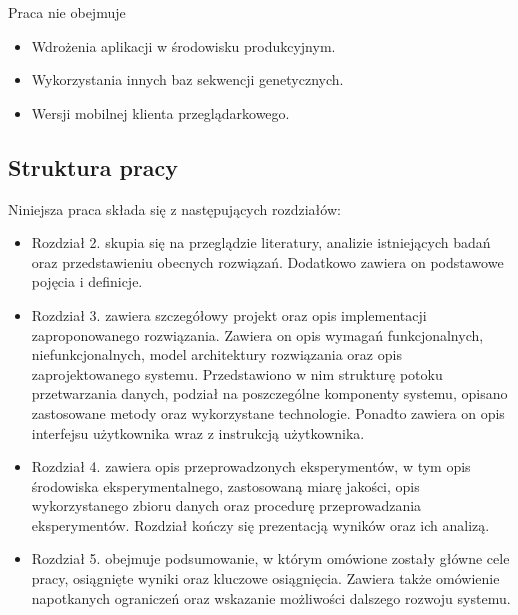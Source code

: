         Praca nie obejmuje
        \begin{itemize}
            \item {
                Wdrożenia aplikacji w środowisku produkcyjnym.
            }
            \item {
                Wykorzystania innych baz sekwencji genetycznych.
            }
            \item {
                Wersji mobilnej klienta przeglądarkowego.
            }
        \end{itemize}

    \subsection {Struktura pracy}

        Niniejsza praca składa się z następujących rozdziałów:

        \begin{itemize}
            \item {
                Rozdział 2. skupia się na przeglądzie literatury, analizie istniejących badań oraz przedstawieniu obecnych rozwiązań. Dodatkowo zawiera on podstawowe pojęcia i definicje.
            }
            \item {
                Rozdział 3. zawiera szczegółowy projekt oraz opis implementacji zaproponowanego rozwiązania. Zawiera on opis wymagań funkcjonalnych, niefunkcjonalnych, model architektury rozwiązania oraz opis zaprojektowanego systemu. Przedstawiono w nim strukturę potoku przetwarzania danych, podział na poszczególne komponenty systemu, opisano zastosowane metody oraz wykorzystane technologie. Ponadto zawiera on opis interfejsu użytkownika wraz z instrukcją użytkownika.    
            }
            \item {
                Rozdział 4. zawiera opis przeprowadzonych eksperymentów, w tym opis środowiska eksperymentalnego, zastosowaną miarę jakości, opis wykorzystanego zbioru danych oraz procedurę przeprowadzania eksperymentów. Rozdział kończy się prezentacją wyników oraz ich analizą.
            }
            \item {
                Rozdział 5. obejmuje podsumowanie, w którym omówione zostały główne cele pracy, osiągnięte wyniki oraz kluczowe osiągnięcia. Zawiera także omówienie napotkanych ograniczeń oraz wskazanie możliwości dalszego rozwoju systemu.
            }
        \end{itemize}
